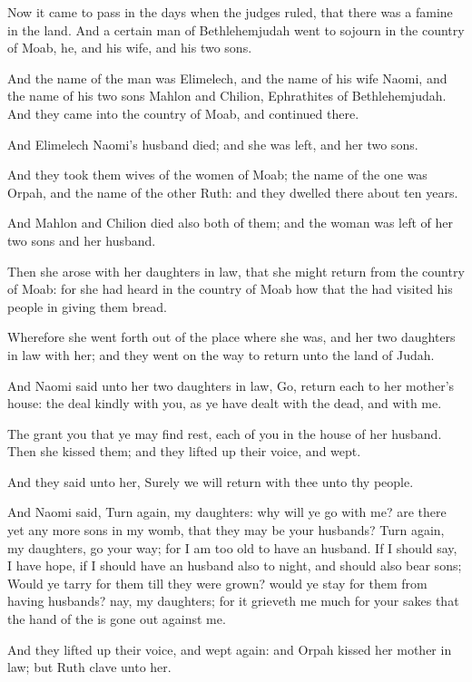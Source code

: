 \Chapter
\Verse Now it came to pass in the days when the judges ruled, that there was a famine in the land. And a certain man of Bethlehemjudah went to sojourn in the country of Moab, he, and his wife, and his two sons.

\Verse And the name of the man was Elimelech, and the name of his wife Naomi, and the name of his two sons Mahlon and Chilion, Ephrathites of Bethlehemjudah. And they came into the country of Moab, and continued there.

\Verse And Elimelech Naomi's husband died; and she was left, and her two sons.

\Verse And they took them wives of the women of Moab; the name of the one was Orpah, and the name of the other Ruth: and they dwelled there about ten years.

\Verse And Mahlon and Chilion died also both of them; and the woman was left of her two sons and her husband.

\Verse Then she arose with her daughters in law, that she might return from the country of Moab: for she had heard in the country of Moab how that the \LORD had visited his people in giving them bread.

\Verse Wherefore she went forth out of the place where she was, and her two daughters in law with her; and they went on the way to return unto the land of Judah.

\Verse And Naomi said unto her two daughters in law, Go, return each to her mother's house: the \LORD deal kindly with you, as ye have dealt with the dead, and with me.

\Verse The \LORD grant you that ye may find rest, each of you in the house of her husband. Then she kissed them; and they lifted up their voice, and wept.

\Verse And they said unto her, Surely we will return with thee unto thy people.

\Verse And Naomi said, Turn again, my daughters: why will ye go with me?  are there yet any more sons in my womb, that they may be your husbands?  \Verse Turn again, my daughters, go your way; for I am too old to have an husband. If I should say, I have hope, if I should have an husband also to night, and should also bear sons; \Verse Would ye tarry for them till they were grown? would ye stay for them from having husbands? nay, my daughters; for it grieveth me much for your sakes that the hand of the \LORD is gone out against me.

\Verse And they lifted up their voice, and wept again: and Orpah kissed her mother in law; but Ruth clave unto her.

